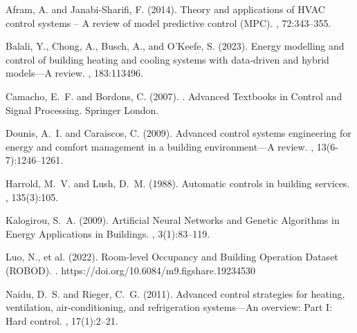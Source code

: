 \documentclass[12pt, a4paper]{article}
\begin{document}
	\newpage
	
	
	\begin{thebibliography}{}
		
		Afram, A. and Janabi-Sharifi, F. (2014). 
		\newblock Theory and applications of HVAC control systems – A review of model predictive control (MPC). 
		, 72:343--355.
		
		Balali, Y., Chong, A., Busch, A., and O’Keefe, S. (2023). 
		\newblock Energy modelling and control of building heating and cooling systems with data-driven and hybrid models—A review. 
		, 183:113496.
		
		Camacho, E.~F. and Bordons, C. (2007).
		. 
		\newblock Advanced Textbooks in Control and Signal Processing. Springer London.
		
		Dounis, A.~I. and Caraiscos, C. (2009).
		\newblock Advanced control systems engineering for energy and comfort management in a building environment—A review. 
		, 13(6-7):1246--1261.
		
		Harrold, M.~V. and Lush, D.~M. (1988).
		\newblock Automatic controls in building services. 
		, 135(3):105.
		
		Kalogirou, S.~A. (2009).
		\newblock Artificial Neural Networks and Genetic Algorithms in Energy Applications in Buildings. 
		, 3(1):83--119.
		
		Luo, N., et al. (2022).
		\newblock Room-level Occupancy and Building Operation Dataset (ROBOD).
		. https://doi.org/10.6084/m9.figshare.19234530
		
		Naidu, D.~S. and Rieger, C.~G. (2011).
		\newblock Advanced control strategies for heating, ventilation, air-conditioning, and refrigeration systems—An overview: Part I: Hard control. 
		, 17(1):2--21.
		

\end{thebibliography}
\end{document}
